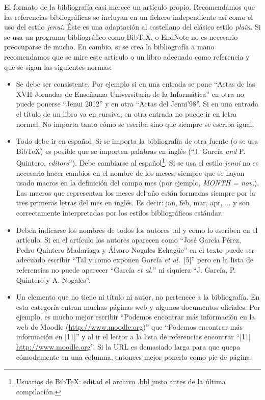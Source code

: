 \documentclass[twocolumn,twoside,a4paper, 10pt]{article}
\begin{document}
El formato de la bibliografía casi merece un artículo propio. 
Recomendamos que las referencias bibliográficas se incluyan en un fichero 
independiente así como el uso del estilo \textit{jenui}. Éste es una adaptación al castellano 
del clásico estilo \textit{plain}.
Si se usa un programa bibliográfico como BibTeX, o EndNote no es necesario 
preocuparse de mucho. En cambio, si se crea la bibliografía a mano 
recomendamos que se mire este artículo o un libro adecuado como 
referencia y que se sigan las siguientes normas:
%
\begin{itemize}
	\item Se debe ser consistente.  Por ejemplo si en una entrada se
	pone ``Actas de las XVII Jornadas de Enseñanza Universitaria de la
	Informática'' en otra no puede ponerse ``Jenui 2012'' y en otra
	``Actas del Jenui'98''.  Si en una entrada el título de un libro
	va en cursiva, en otra entrada no puede ir en letra normal.  No
	importa tanto cómo se escriba sino que siempre se escriba igual.
	
	\item Todo debe ir en español.  Si se importa la bibliografía de
	otra fuente (o se usa BibTeX) es posible que se importen palabras
	en inglés (``J. García \emph{and} P. Quintero, \emph{editors}'').
	Debe cambiarse al español\footnote{Usuarios de BibTeX: editad el
	archivo .bbl justo antes de la última compilación.}. Si se usa el estilo
	\textit{jenui} no es necesario hacer cambios en el nombre de los meses, 
	siempre que se hayan usado macros en la definición del campo mes (por ejemplo, 
	\textit{MONTH = nov,}). Las macros que representan
	los meses del año están formadas siempre por la tres primeras letras del mes en inglés.
	Es decir: jan, feb, mar, apr, $\ldots$ y son correctamente interpretadas por  
	los estilos bibliográficos estándar.
	
	\item Deben indicarse los nombres de todos los autores tal y 
	como lo escriben en el artículo. Si en el artículo los autores 
	aparecen como ``José García Pérez, Pedro Quintero Madariaga y 
	\'Alvaro Nogales Echagüe'' en el texto puede ser adecuado escribir 
	``Tal y como exponen García \emph{et al.}~[5]'' pero en la lista 
	de referencias no puede aparecer ``García \emph{et al.}'' ni 
	siquiera ``J. García, P. Quintero y A. Nogales''. 
	
	\item Un elemento que no tiene ni título ni autor, no pertenece a 
	la bibliografía. En esta categoría entran muchas páginas web y 
	algunos documentos oficiales. Por ejemplo, es mucho mejor 
	escribir ``Podemos encontrar más información en la web de Moodle 
	(\url{http://www.moodle.org})'' que ``Podemos encontrar más 
	información en [11]'' y al ir el lector a la lista de referencias 
	encontrar ``[11] \url{http://www.moodle.org}''. Si la URL es demasiado 
	larga para que quepa cómodamente en una columna, entonces mejor 
	ponerlo como pie de página. 
	

\end{itemize}
\end{document}

